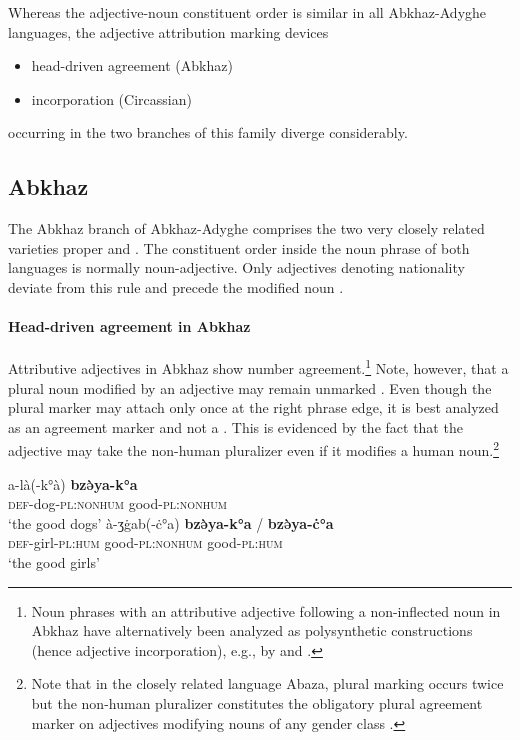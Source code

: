 Whereas the adjective-noun constituent order is similar in all Abkhaz-Adyghe languages, the adjective attribution marking devices
\begin{itemize}
\item head\hyp{}driven agreement (Abkhaz)
\item incorporation (Circassian)
\end{itemize}
occurring in the two branches of this family diverge considerably.

\subsection{Abkhaz}
The Abkhaz branch of Abkhaz-Adyghe comprises the two very closely related varieties  proper and . The constituent order inside the noun phrase of both languages is normally noun-adjective. Only adjectives denoting nationality deviate from this rule and precede the modified noun \citep[222]{comrie1981}.

\paragraph*{Head\hyp{}driven agreement in Abkhaz}
Attributive adjectives in Abkhaz show number agreement.\footnote{Noun phrases with an attributive adjective following a non-inflected noun in Abkhaz have alternatively been analyzed as polysynthetic constructions (hence adjective incorporation), e.g., by \citet[123]{rijkhoff2002} and \citet{gil2005}.} Note, however, that a plural noun modified by an adjective may remain unmarked \citep[46]{hewitt1989a}. Even though the plural marker may attach only once at the right phrase edge, it is best analyzed as an agreement marker and not a . This is evidenced by the fact that the adjective may take the non-human pluralizer even if it modifies a human noun.\footnote{Note that in the closely related language Abaza, plural marking occurs twice but the non-human pluralizer constitutes the obligatory plural agreement marker on adjectives modifying nouns of any gender class \citep[100]{lomtatidze-etal1989}.}
\begin{exe}
\begin{xlist}
\ex
\gll	a-là(-k°à) \textbf{bzə̀ya-k°a}\\
	\textsc{def}-dog-\textsc{pl:nonhum} good-\textsc{pl:nonhum}\\
\glt	‘the good dogs’
\ex	
\gll	à-ʒġab(-ċ°a) \textbf{bzə̀ya-k°a} / \textbf{bzə̀ya-ċ°a}\\
	\textsc{def}-girl-\textsc{pl:hum} good-\textsc{pl:nonhum} {} good-\textsc{pl:hum}\\
\glt	‘the good girls’
\end{xlist}
\end{exe}

